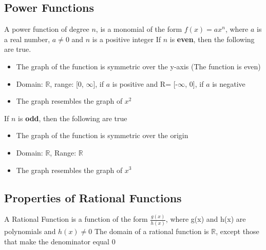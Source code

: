 \documentclass{report}
\begin{document}
    \subsection{Power Functions}
    A power function of degree $n $, is a monomial of the form $f(x) = ax^{n}$, where $a $ is a real number, $a \neq 0 $ and $n$ is a positive integer
    \bigbreak \noindent 
    If $n$ is \textbf{even}, then the following are true.
    \begin{itemize}
      \item The graph of the function is symmetric over the y-axis (The function is even)
      \item Domain: $ \mathbb{R}$, range: [0, $\infty$], if $a$ is positive and R= [-$\infty$, 0], if $a $ is negative
      \item The graph resembles the graph of $x^{2} $
    \end{itemize}
    \bigbreak \noindent 
    If $n $ is \textbf{odd}, then the following are true
    \begin{itemize}
      \item The graph of the function is symmetric over the origin
      \item Domain: $ \mathbb{R} $, Range: $ \mathbb{R} $
      \item The graph resembles the graph of $x^{3}$
    \end{itemize}

    \bigbreak \noindent \bigbreak \noindent 
    \subsection{Properties of Rational Functions}
    A Rational Function is a function of the form $\frac{g(x)}{h(x)}$, where g(x) and h(x) are polynomials and $h(x) \neq 0$
    \bigbreak \noindent 
    The domain of a rational function is $ \mathbb{R}$, except those that make the denominator equal 0
\end{document}
